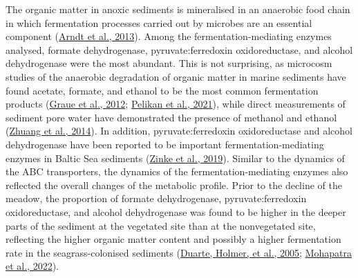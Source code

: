 \documentclass[
  12 pt,
]{book}
\begin{document}
The organic matter in anoxic sediments is mineralised in an anaerobic food chain in which fermentation processes carried out by microbes are an essential component (\protect\hyperlink{ref-Arndt2013}{Arndt et al., 2013}). Among the fermentation-mediating enzymes analysed, formate dehydrogenase, pyruvate:ferredoxin oxidoreductase, and alcohol dehydrogenase were the most abundant. This is not surprising, as microcosm studies of the anaerobic degradation of organic matter in marine sediments have found acetate, formate, and ethanol to be the most common fermentation products (\protect\hyperlink{ref-Graue2012}{Graue et al., 2012}; \protect\hyperlink{ref-Pelikan2021}{Pelikan et al., 2021}), while direct measurements of sediment pore water have demonstrated the presence of methanol and ethanol (\protect\hyperlink{ref-Zhuang2014}{Zhuang et al., 2014}). In addition, pyruvate:ferredoxin oxidoreductase and alcohol dehydrogenase have been reported to be important fermentation-mediating enzymes in Baltic Sea sediments (\protect\hyperlink{ref-Zinke2019}{Zinke et al., 2019}). Similar to the dynamics of the ABC transporters, the dynamics of the fermentation-mediating enzymes also reflected the overall changes of the metabolic profile. Prior to the decline of the meadow, the proportion of formate dehydrogenase, pyruvate:ferredoxin oxidoreductase, and alcohol dehydrogenase was found to be higher in the deeper parts of the sediment at the vegetated site than at the nonvegetated site, reflecting the higher organic matter content and possibly a higher fermentation rate in the seagrass-colonised sediments (\protect\hyperlink{ref-Duarte2005}{Duarte, Holmer, et al., 2005}; \protect\hyperlink{ref-Mohapatra2022}{Mohapatra et al., 2022}).
\end{document}
